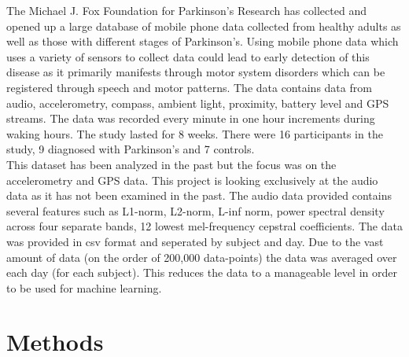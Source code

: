 \documentclass[twoside]{article}
\begin{document}
\begin{multicols}{2}
The Michael J. Fox Foundation for Parkinson's Research has collected and opened up a large
database of mobile phone data collected from healthy adults as well as those with different stages of
Parkinson's. Using mobile phone data which uses a variety of sensors to collect data could lead to early
detection of this disease as it primarily manifests through motor system disorders which can be
registered through speech and motor patterns. The data contains data from audio, accelerometry,
compass, ambient light, proximity, battery level and GPS streams. The data was recorded every minute
in one hour increments during waking hours. The study lasted for 8 weeks. There were 16 participants in the study,
9 diagnosed with Parkinson's and 7 controls.\\
This dataset has been analyzed in the past but the focus was on the accelerometry and GPS data. 
This project is looking exclusively at the audio data as it has not been examined in the past. 
The audio data provided contains several features such as L1-norm, L2-norm, L-inf norm,
power spectral density across four separate bands, 12 lowest mel-frequency cepstral coefficients.
The data was provided in csv format and seperated by subject and day.
Due to the vast amount of data (on the order of 200,000 data-points) the data was averaged over each day (for
each subject). This reduces the data to a manageable level in order to be used for machine learning.



\section{Methods}


\end{multicols}
\end{document}
